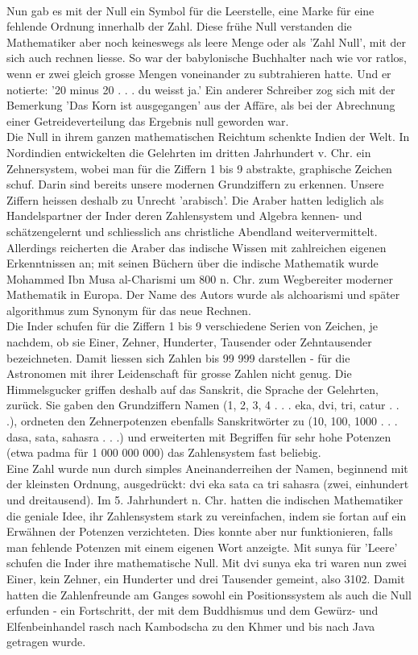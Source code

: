 \documentclass[%
11pt,%
twoside,%
titlepage,%
german,%
headsepline%
]{scrartcl}
\begin{document}
\begin{multicols}{2}
\\
Nun gab es mit der Null ein Symbol für die Leerstelle, eine Marke für eine fehlende Ordnung innerhalb der Zahl. Diese frühe Null verstanden die Mathematiker aber noch keineswegs als leere Menge oder als 'Zahl Null', mit der sich auch rechnen liesse. So war der babylonische Buchhalter nach wie vor ratlos, wenn er zwei gleich grosse Mengen voneinander zu subtrahieren hatte. Und er notierte: '20 minus 20 . . . du weisst ja.' Ein anderer Schreiber zog sich mit der Bemerkung 'Das Korn ist ausgegangen' aus der Affäre, als bei der Abrechnung einer Getreideverteilung das Ergebnis null geworden war.
\\[5mm]
Die Null in ihrem ganzen mathematischen Reichtum schenkte Indien der Welt. In Nordindien entwickelten die Gelehrten im dritten Jahrhundert v. Chr. ein Zehnersystem, wobei man für die Ziffern 1 bis 9 abstrakte, graphische Zeichen schuf. Darin sind bereits unsere modernen Grundziffern zu erkennen. Unsere Ziffern heissen deshalb zu Unrecht 'arabisch'. Die Araber hatten lediglich als Handelspartner der Inder deren Zahlensystem und Algebra kennen- und schätzengelernt und schliesslich ans christliche Abendland weitervermittelt. Allerdings reicherten die Araber das indische Wissen mit zahlreichen eigenen Erkenntnissen an; mit seinen Büchern über die indische Mathematik wurde Mohammed Ibn Musa al-Charismi um 800 n. Chr. zum Wegbereiter moderner Mathematik in Europa. Der Name des Autors wurde als alchoarismi und später algorithmus zum Synonym für das neue Rechnen.
\\
Die Inder schufen für die Ziffern 1 bis 9 verschiedene Serien von Zeichen, je nachdem, ob sie Einer, Zehner, Hunderter, Tausender oder Zehntausender bezeichneten. Damit liessen sich Zahlen bis 99 999 darstellen - für die Astronomen mit ihrer Leidenschaft für grosse Zahlen nicht genug. Die Himmelsgucker griffen deshalb auf das Sanskrit, die Sprache der Gelehrten, zurück. Sie gaben den Grundziffern Namen (1, 2, 3, 4 . . . eka, dvi, tri, catur . . .), ordneten den Zehnerpotenzen ebenfalls Sanskritwörter zu (10, 100, 1000 . . . dasa, sata, sahasra . . .) und erweiterten mit Begriffen für sehr hohe Potenzen (etwa padma für 1 000 000 000) das Zahlensystem fast beliebig.
\\
Eine Zahl wurde nun durch simples Aneinanderreihen der Namen, beginnend mit der kleinsten Ordnung, ausgedrückt: dvi eka sata ca tri sahasra (zwei, einhundert und dreitausend). Im 5. Jahrhundert n. Chr. hatten die indischen Mathematiker die geniale Idee, ihr Zahlensystem stark zu vereinfachen, indem sie fortan auf ein Erwähnen der Potenzen verzichteten. Dies konnte aber nur funktionieren, falls man fehlende Potenzen mit einem eigenen Wort anzeigte. Mit sunya für 'Leere' schufen die Inder ihre mathematische Null. Mit dvi sunya eka tri waren nun zwei Einer, kein Zehner, ein Hunderter und drei Tausender gemeint, also 3102. Damit hatten die Zahlenfreunde am Ganges sowohl ein Positionssystem als auch die Null erfunden - ein Fortschritt, der mit dem Buddhismus und dem Gewürz- und Elfenbeinhandel rasch nach Kambodscha zu den Khmer und bis nach Java getragen wurde.

\end{multicols}
\end{document}
